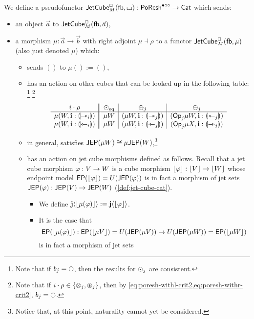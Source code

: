 \documentclass[a4paper]{memoir}
\begin{document}
\begin{definition}
	We define a pseudofunctor $\mathsf{JetCube}^{\Box}_{M}({\mathsf{fb}},{\llcorner\hspace{-.4ex}\lrcorner}) : \mathsf{PoResh}^{\bullet \circ \circ} \to {\mathsf{Cat}}$ which sends:
	\begin{itemize}
		\item an object $\vec a$ to $\mathsf{JetCube}^{\Box}_{M}({\mathsf{fb}},\vec a)$,
		\item a morphism $\mu : \vec a \to \vec b$ with right adjoint $\mu \dashv \rho$ to a functor $\mathsf{JetCube}^{\Box}_{M}({\mathsf{fb}},\mu)$ (also just denoted $\mu$) which:
		\begin{itemize}
			\item sends $()$ to $\mu () := ()$,
			\item has an action on other cubes that can be looked up in the following table:%
			\footnote{Note that if $b_j = \npolar$, then the results for ${\odot}_j$ are consistent.}%
			\footnote{Note that if $i \cdot \rho \in \mathopen{}\left\{ {\otimes}_j, {\oast}_j \right\}\mathclose{}$, then by \cref{eq:poresh-withl-crit2,eq:poresh-withr-crit2}, $b_j = \npolar$.}
			\[
				\begin{array}{c || c | c | c}
					i \cdot \rho 
					& {\odot}_{\mathrm{eq}} 
					& {\oplus}_j
					& {\ominus}_j 
					\\ \hline
					\mu(W, \mathbf{i} : {\llparenthesis {\rightarrowtriangle}_i \rrparenthesis})
					& \mu W
					& (\mu W, \mathbf{i} : {\llparenthesis {\rightarrowtriangle}_j \rrparenthesis})
					& ({\mathsf{Op}}_j \mu W, \mathbf{i} : {\llparenthesis {\leftarrowtriangle}_j \rrparenthesis})
					\\
					\mu(W, \mathbf{i} : {\llparenthesis {\leftarrowtriangle}_i \rrparenthesis})
					& \mu W
					& (\mu W, \mathbf{i} : {\llparenthesis {\leftarrowtriangle}_j \rrparenthesis})
					& ({\mathsf{Op}}_j\mu X, \mathbf{i} : {\llparenthesis {\rightarrowtriangle}_j \rrparenthesis})
				\end{array}
			\]
			\item in general, satisfies $\mathsf{JEP}(\mu W) \cong \mu \mathsf{JEP}(W)$,\footnote{Notice that, at this point, naturality cannot yet be considered.}
			\item has an action on jet cube morphisms defined as follows. Recall that a jet cube morphism $\varphi : V \to W$ is a cube morphism $\mathopen{}\left\lfloor \varphi \right\rfloor\mathclose{} : \mathopen{}\left\lfloor V \right\rfloor\mathclose{} \to \mathopen{}\left\lfloor W \right\rfloor\mathclose{}$ whose endpoint model $\mathsf{EP}(\mathopen{}\left\lfloor \varphi \right\rfloor\mathclose{}) = U(\mathsf{JEP}(\varphi))$ is in fact a morphism of jet sets $\mathsf{JEP}(\varphi) : \mathsf{JEP}(V) \to \mathsf{JEP}(W)$ (\cref{def:jet-cube-cat}).
			\begin{itemize}
				\item We define $\mathbf{j} \langle \mathopen{}\left\lfloor \mu(\varphi) \right\rfloor\mathclose{} \rangle := \mathbf{j} \langle \mathopen{}\left\lfloor \varphi \right\rfloor\mathclose{} \rangle$. 
				\item It is the case that
				\[
					\mathsf{EP}(\mathopen{}\left\lfloor \mu(\varphi) \right\rfloor\mathclose{}) : \mathsf{EP}(\mathopen{}\left\lfloor \mu V \right\rfloor\mathclose{}) = U(\mathsf{JEP}(\mu V)) \to U(\mathsf{JEP}(\mu W)) = \mathsf{EP}(\mathopen{}\left\lfloor \mu W \right\rfloor\mathclose{})
				\]
				is in fact a morphism of jet sets
			\end{itemize}
		\end{itemize}
	\end{itemize}
\end{definition}
\end{document}
